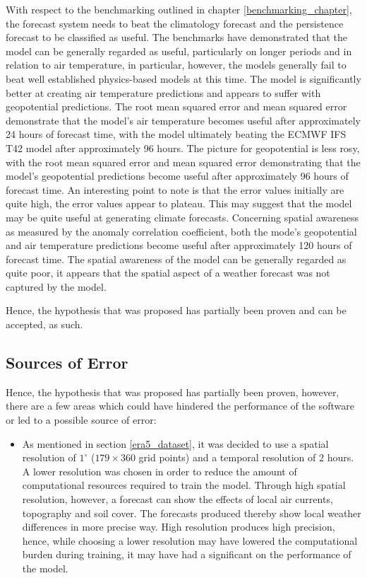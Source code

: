 With respect to the benchmarking outlined in chapter \ref{benchmarking_chapter}, the forecast system needs to beat the climatology forecast and the persistence forecast to be classified as useful. The benchmarks have demonstrated that the model can be generally regarded as useful, particularly on longer periods and in relation to air temperature, in particular, however, the models generally fail to beat well established physics-based models at this time. The model is significantly better at creating air temperature predictions and appears to suffer with geopotential predictions. The root mean squared error and mean squared error demonstrate that the model's air temperature becomes useful after approximately 24 hours of forecast time, with the model ultimately beating the ECMWF IFS T42 model after approximately 96 hours. The picture for geopotential is less rosy, with the root mean squared error and mean squared error demonstrating that the model's geopotential predictions become useful after approximately 96 hours of forecast time. An interesting point to note is that the error values initially are quite high, the error values appear to plateau. This may suggest that the model may be quite useful at generating climate forecasts. Concerning spatial awareness as measured by the anomaly correlation coefficient, both the mode's geopotential and air temperature predictions become useful after approximately 120 hours of forecast time. The spatial awareness of the model can be generally regarded as quite poor, it appears that the spatial aspect of a weather forecast was not captured by the model. 

Hence, the hypothesis that was proposed has partially been proven and can be accepted, as such.

\subsection{Sources of Error}

Hence, the hypothesis that was proposed has partially been proven, however, there are a few areas which could have hindered the performance of the software or led to a possible source of error:

\begin{itemize}
    \item As mentioned in section \ref{era5_dataset}, it was decided to use a spatial resolution of $1^{\circ}$ ($179 \times 360$ grid points) and a temporal resolution of 2 hours. A lower resolution was chosen in order to reduce the amount of computational resources required to train the model. Through high spatial resolution, however, a forecast can show the effects of local air currents, topography and soil cover. The forecasts produced thereby show local weather differences in more precise way\cite{res}. High resolution produces high precision, hence, while choosing a lower resolution may have lowered the computational burden during training, it may have had a significant on the performance of the model.
\end{itemize}

